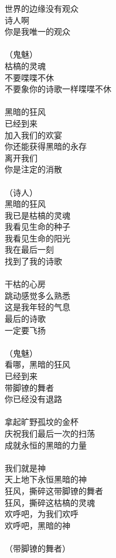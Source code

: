 世界的边缘没有观众\\
诗人啊\\
你是我唯一的观众\\
\\
（鬼魅）\\
枯槁的灵魂\\
不要喋喋不休\\
不要象你的诗歌一样喋喋不休\\
\\
黑暗的狂风\\
已经到来\\
加入我们的欢宴\\
你还能获得黑暗的永存\\
离开我们\\
你是注定的消散\\
\\
（诗人）\\
黑暗的狂风\\
我已是枯槁的灵魂\\
我看见生命的种子\\
我看见生命的阳光\\
我在最后一刻\\
找到了我的诗歌\\
\\
干枯的心房\\
跳动感觉多么熟悉\\
这是我年轻的气息\\
最后的诗歌\\
一定要飞扬\\
\\
（鬼魅）\\
看哪，黑暗的狂风\\
已经到来\\
带脚镣的舞者\\
你已经没有退路\\
\\
拿起旷野孤坟的金杯\\
庆祝我们最后一次的扫荡\\
成就永恒的黑暗的力量\\
\\
我们就是神\\
天上地下永恒黑暗的神\\
狂风，撕碎这带脚镣的舞者\\
狂风，撕碎这枯槁的灵魂\\
欢呼吧，为我们欢呼\\
欢呼吧，黑暗的神\\
\\
（带脚镣的舞者）\\
